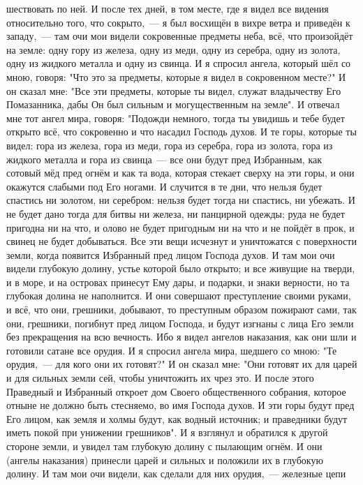 шествовать по ней.
И после тех дней, в том месте, где я видел все видения
относительно того, что сокрыто,~--- я был восхищён в вихре ветра и приведён к
западу,~--- там очи мои видели сокровенные предметы неба, всё, что произойдёт на
земле: одну гору из железа, одну из меди, одну из серебра, одну из золота,
одну из жидкого металла и одну из свинца.
И я спросил ангела, который шёл со мною, говоря: "Что это за предметы,
которые я видел в сокровенном месте?"
И он сказал мне: "Все эти предметы, которые ты видел, служат
владычеству Его Помазанника, дабы Он был сильным и могущественным на земле".
И отвечал мне тот ангел мира, говоря: "Подожди немного, тогда ты
увидишь и тебе будет открыто всё, что сокровенно и что насадил Господь духов.
И те горы, которые ты видел: гора из железа, гора из меди, гора из
серебра, гора из золота, гора из жидкого металла и гора из свинца~--- все они
будут пред Избранным, как сотовый мёд пред огнём и как та вода, которая стекает
сверху на эти горы, и они окажутся слабыми под Его ногами.
И случится в те дни, что нельзя будет спастись ни золотом, ни
серебром: нельзя будет тогда ни спастись, ни убежать.
И не будет дано тогда для битвы ни железа, ни панцирной одежды; руда
не будет пригодна ни на что, и олово не будет пригодным ни на что и не пойдёт в
прок, и свинец не будет добываться.
Все эти вещи исчезнут и уничтожатся с поверхности земли, когда
появится Избранный пред лицом Господа духов.
И там мои очи видели глубокую долину, устье которой было открыто;
и все живущие на тверди, и в море, и на островах принесут Ему дары, и подарки,
и знаки верности, но та глубокая долина не наполнится.
И они совершают преступление своими руками, и всё, что они, грешники,
добывают, то преступным образом пожирают сами, так они, грешники, погибнут пред
лицом Господа, и будут изгнаны с лица Его земли без прекращения на всю
вечность.
Ибо я видел ангелов наказания, как они шли и готовили сатане все
орудия.
И я спросил ангела мира, шедшего со мною: "Те орудия,~--- для кого они
их готовят?"
И он сказал мне: "Они готовят их для царей и для сильных земли сей,
чтобы уничтожить их чрез это.
И после этого Праведный и Избранный откроет дом Своего общественного
собрания, которое отныне не должно быть стесняемо, во имя Господа духов.
И эти горы будут пред Его лицом, как земля и холмы будут, как водный
источник; и праведники будут иметь покой при унижении грешников".
И я взглянул и обратился к другой стороне земли, и увидел там
глубокую долину с пылающим огнём.
И они (ангелы наказания) принесли царей и сильных и положили их в
глубокую долину.
И там мои очи видели, как сделали для них орудия,~--- железные цепи
